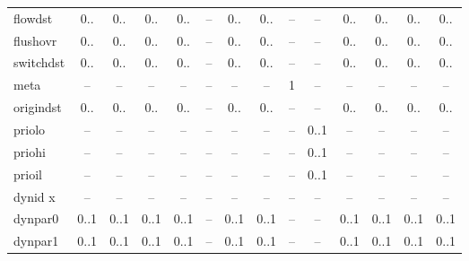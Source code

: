 \begin{table}
\begin{adjustwidth}{-21mm}{}
\begin{tabular}[t]{|p{17.4mm}|c|c|c|c|c|c|c|c|c|c|c|c|c|}
flowdst           & 0..        & 0..             & 0..        & 0..        & --           & 0..        & 0..         & --        & --         & 0..              & 0..         & 0..        & 0..      \\
flushovr          & 0..        & 0..             & 0..        & 0..        & --           & 0..        & 0..         & --        & --         & 0..              & 0..         & 0..        & 0..      \\
switchdst         & 0..        & 0..             & 0..        & 0..        & --           & 0..        & 0..         & --        & --         & 0..              & 0..         & 0..        & 0..      \\
meta              & --         & --              & --         & --         & --           & --         & --          & 1         & --         & --               & --          & --         & --       \\
origindst         & 0..        & 0..             & 0..        & 0..        & --           & 0..        & 0..         & --        & --         & 0..              & 0..         & 0..        & 0..      \\
priolo            & --         & --              & --         & --         & --           & --         & --          & --        & 0..1       & --               & --          & --         & --       \\
priohi            & --         & --              & --         & --         & --           & --         & --          & --        & 0..1       & --               & --          & --         & --       \\
prioil            & --         & --              & --         & --         & --           & --         & --          & --        & 0..1       & --               & --          & --         & --       \\
dynid x           & --         & --              & --         & --         & --           & --         & --          & --        & --         & --               & --          & --         & --       \\
dynpar0           & 0..1       & 0..1            & 0..1       & 0..1       & --           & 0..1       & 0..1        & --        & --         & 0..1             & 0..1        & 0..1       & 0..1     \\
dynpar1           & 0..1       & 0..1            & 0..1       & 0..1       & --           & 0..1       & 0..1        & --        & --         & 0..1             & 0..1        & 0..1       & 0..1     \\

\end{tabular}
\end{adjustwidth}
\end{table}
